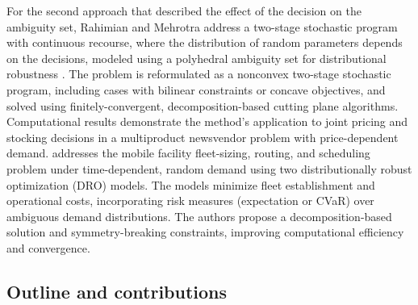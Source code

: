 \documentclass[12pt, letterpaper]{article}
\begin{document}
	For the second approach that described the effect of the decision on the ambiguity set, Rahimian and Mehrotra address a two-stage stochastic program with continuous recourse, where the distribution of random parameters depends on the decisions, modeled using a polyhedral ambiguity set for distributional robustness \cite{rahimiandistributionally}. The problem is reformulated as a nonconvex two-stage stochastic program, including cases with bilinear constraints or concave objectives, and solved using finitely-convergent, decomposition-based cutting plane algorithms. Computational results demonstrate the method’s application to joint pricing and stocking decisions in a multiproduct newsvendor problem with price-dependent demand.
	\cite{shehadeh_distributionally_2023} addresses the mobile facility fleet-sizing, routing, and scheduling problem under time-dependent, random demand using two distributionally robust optimization (DRO) models. The models minimize fleet establishment and operational costs, incorporating risk measures (expectation or CVaR) over ambiguous demand distributions. The authors propose a decomposition-based solution and symmetry-breaking constraints, improving computational efficiency and convergence.
	
	\subsection*{Outline and contributions}
\end{document}
